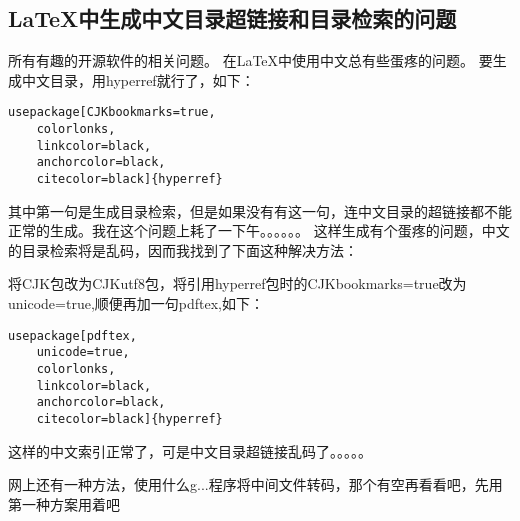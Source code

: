 \documentclass{book}
\begin{document}
\begin{CJK}{UTF8}{gbsn}
\newpage


\section*{LaTeX中生成中文目录超链接和目录检索的问题}

所有有趣的开源软件的相关问题。
在LaTeX中使用中文总有些蛋疼的问题。
要生成中文目录，用hyperref就行了，如下：

\begin{lstlisting}
usepackage[CJKbookmarks=true,
	colorlonks,
	linkcolor=black,
	anchorcolor=black,
	citecolor=black]{hyperref}
\end{lstlisting}

其中第一句是生成目录检索，但是如果没有有这一句，连中文目录的超链接都不能正常的生成。我在这个问题上耗了一下午。。。。。。
这样生成有个蛋疼的问题，中文的目录检索将是乱码，因而我找到了下面这种解决方法：

将CJK包改为CJKutf8包，将引用hyperref包时的CJKbookmarks=true改为unicode=true,顺便再加一句pdftex,如下：

\begin{lstlisting}
usepackage[pdftex,
	unicode=true,
	colorlonks,
	linkcolor=black,
	anchorcolor=black,
	citecolor=black]{hyperref}
\end{lstlisting}

这样的中文索引正常了，可是中文目录超链接乱码了。。。。。

网上还有一种方法，使用什么g...程序将中间文件转码，那个有空再看看吧，先用第一种方案用着吧

\newpage
\end{CJK}
\end{document}
